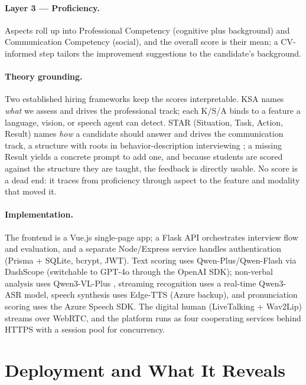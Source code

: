 \documentclass[11pt]{article}
\begin{document}
\paragraph{Layer 3 --- Proficiency.} Aspects roll up into Professional Competency (cognitive plus background) and Communication Competency (social), and the overall score is their mean; a CV-informed step tailors the improvement suggestions to the candidate's background.

\paragraph{Theory grounding.} Two established hiring frameworks keep the scores interpretable. KSA names \emph{what} we assess and drives the professional track; each K/S/A binds to a feature a language, vision, or speech agent can detect. STAR (Situation, Task, Action, Result) names \emph{how} a candidate should answer and drives the communication track, a structure with roots in behavior-description interviewing \citep{janz1982behavior}; a missing Result yields a concrete prompt to add one, and because students are scored against the structure they are taught, the feedback is directly usable. No score is a dead end: it traces from proficiency through aspect to the feature and modality that moved it.

\paragraph{Implementation.} The frontend is a Vue.js single-page app; a Flask API orchestrates interview flow and evaluation, and a separate Node/Express service handles authentication (Prisma + SQLite, bcrypt, JWT). Text scoring uses Qwen-Plus/Qwen-Flash via DashScope (switchable to GPT-4o through the OpenAI SDK); non-verbal analysis uses Qwen3-VL-Plus \citep{bai2023qwenvl}, streaming recognition uses a real-time Qwen3-ASR model, speech synthesis uses Edge-TTS (Azure backup), and pronunciation scoring uses the Azure Speech SDK. The digital human (LiveTalking + Wav2Lip) streams over WebRTC, and the platform runs as four cooperating services behind HTTPS with a session pool for concurrency.

\section{Deployment and What It Reveals}
\label{sec:deploy}


\end{document}
